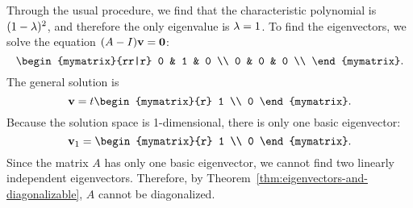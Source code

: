 \begin{solution}
  Through the usual procedure, we find that the characteristic
  polynomial is $(1-\lambda)^2$, and therefore the only eigenvalue is
  $\lambda=1$. To find the eigenvectors, we solve the equation
  $(A-I)\mbox{\bf v} = \mbox{\bf 0}$:
  \begin{equation*}
    \begin{mymatrix}{rr|r}
      0 & 1 & 0 \\
      0 & 0 & 0 \\
    \end{mymatrix}.
  \end{equation*}
  The general solution is
  \begin{equation*}
    \vect{v} = t\begin{mymatrix}{r} 1 \\ 0 \end{mymatrix}.
  \end{equation*}
  Because the solution space is 1-dimensional, there is only one basic
  eigenvector:
  \begin{equation*}
    \vect{v}_1 = \begin{mymatrix}{r} 1 \\ 0 \end{mymatrix}.
  \end{equation*}
  Since the matrix $A$ has only one basic eigenvector, we cannot find
  two linearly independent eigenvectors. Therefore, by
  Theorem~\ref{thm:eigenvectors-and-diagonalizable}, $A$ cannot be
  diagonalized.
\end{solution}

